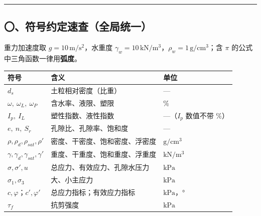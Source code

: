 \documentclass[
]{article}
\newcounter{none} %
\begin{document}
\begin{center}\rule{0.5\linewidth}{0.5pt}\end{center}

\subsection{〇、符号约定速查（全局统一）}\label{ux7b26ux53f7ux7ea6ux5b9aux901fux67e5ux5168ux5c40ux7edfux4e00}

重力加速度取 \(g=10\,\mathrm{m/s^2}\)，水重度
\(\gamma_w=10\,\mathrm{kN/m^3}\)，\(\rho_w=1\,\mathrm{g/cm^3}\)；含
\(\pi\) 的公式中三角函数一律用\textbf{弧度}。

{\def\LTcaptype{none} %
\begin{longtable}[]{@{}
  >{\raggedright\arraybackslash}p{}
  >{\raggedright\arraybackslash}p{}
  >{\raggedright\arraybackslash}p{}@{}}
\toprule\noalign{}
\begin{minipage}[b]{\linewidth}\raggedright
符号
\end{minipage} & \begin{minipage}[b]{\linewidth}\raggedright
含义
\end{minipage} & \begin{minipage}[b]{\linewidth}\raggedright
单位
\end{minipage} \\
\midrule\noalign{}
\endhead
\bottomrule\noalign{}
\endlastfoot
\(d_s\) & 土粒相对密度（比重） & --- \\
\(\omega,\ \omega_L,\ \omega_P\) & 含水率、液限、塑限 & \% \\
\(I_p,\ I_L\) & 塑性指数、液性指数 & ---（\(I_p\) 数值不带 \%） \\
\(e,\ n,\ S_r\) & 孔隙比、孔隙率、饱和度 & --- \\
\(\rho,\rho_d,\rho_{sat},\rho'\) & 密度、干密度、饱和密度、浮密度 &
\(\mathrm{g/cm^3}\) \\
\(\gamma,\gamma_d,\gamma_{sat},\gamma'\) &
重度、干重度、饱和重度、浮重度 & \(\mathrm{kN/m^3}\) \\
\(\sigma,\sigma',u\) & 总应力、有效应力、孔隙水压力 &
\(\mathrm{kPa}\) \\
\(\sigma_1,\sigma_3\) & 大、小主应力 & \(\mathrm{kPa}\) \\
\(c,\varphi\)；\(c',\varphi'\) & 总应力指标；有效应力指标 &
\(\mathrm{kPa}\)，° \\
\(\tau_f\) & 抗剪强度 & \(\mathrm{kPa}\) \\

\end{longtable}}
\end{document}
